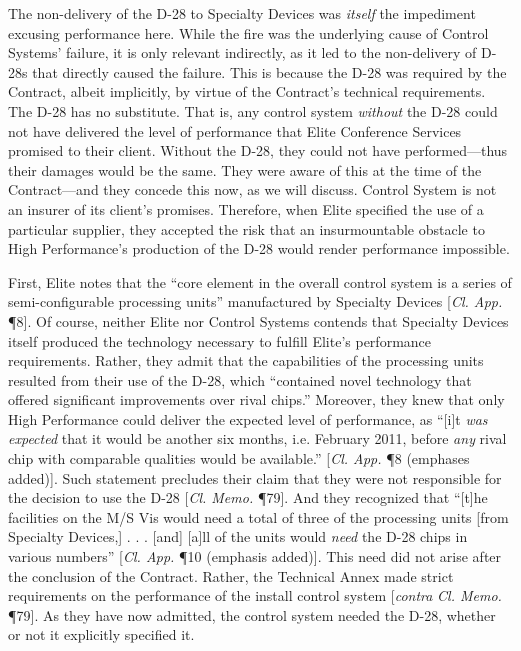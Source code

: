 The non-delivery of the D-28 to Specialty Devices was \textit{itself} the impediment excusing performance here. While the fire was the underlying cause of Control Systems' failure, it is only relevant indirectly, as it led to the non-delivery of D-28s that directly caused the failure. This is because the D-28 was required by the Contract, albeit implicitly, by virtue of the Contract's technical requirements.  The D-28 has no substitute. That is, any control system \textit{without} the D-28 could not have delivered the level of performance that Elite Conference Services promised to their client. Without the D-28, they could not have performed---thus their damages would be the same. They were aware of this at the time of the Contract---and they concede this now, as we will discuss. Control System is not an insurer of its client's promises. Therefore, when Elite specified the use of a particular supplier, they accepted the risk that an insurmountable obstacle to High Performance's production of the D-28 would render performance impossible.  

First, Elite notes that the ``core element in the overall control system is a series of semi-configurable processing units'' manufactured by Specialty Devices [\textit{Cl. App.} \P 8]. Of course, neither Elite nor Control Systems contends that Specialty Devices itself produced the technology necessary to fulfill Elite's performance requirements. Rather, they admit that the capabilities of the processing units resulted from their use of the D-28, which  ``contained novel technology that offered significant improvements over rival chips.'' Moreover, they knew that only High Performance could deliver the expected level of performance, as ``[i]t \textit{was expected} that it would be another six months, i.e. February 2011, before \textit{any} rival chip with comparable qualities would be available.'' [\textit{Cl. App.} \P 8 (emphases added)]. Such statement precludes their claim that they were not responsible for the decision to use the D-28 [\textit{Cl. Memo.} \P79].  And they recognized that ``[t]he facilities on the M/S Vis would need a total of three of the processing units [from Specialty Devices,] . . . [and] [a]ll of the units would \textit{need} the D-28 chips in various numbers'' [\textit{Cl. App.} \P 10 (emphasis added)].  This need did not arise after the conclusion of the Contract. Rather, the Technical Annex made strict requirements on the performance of the install control system [\textit{contra} \textit{Cl. Memo.} \P79]. As they have now admitted, the control system needed the D-28, whether or not it explicitly specified it.

